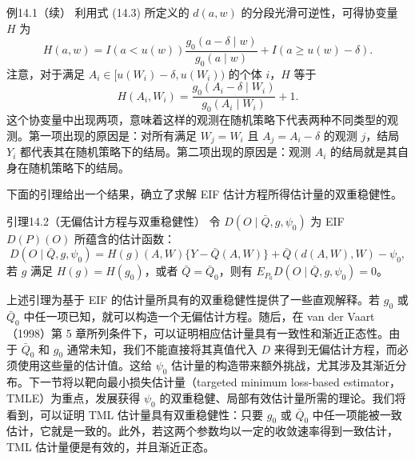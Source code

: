 \begin{bookresult}{例}{14.1（续）}
利用式 (14.3) 所定义的 $d(a,w)$ 的分段光滑可逆性，可得协变量 $H$ 为
\[
 H(a,w)=I(a<u(w))\frac{g_0(a-\delta\mid w)}{g_0(a\mid w)}
 +I(a\geq u(w)-\delta).
\]
注意，对于满足 $A_i\in[u(W_i)-\delta,u(W_i))$ 的个体 $i$，$H$ 等于
\[
 H(A_i,W_i)=\frac{g_0(A_i-\delta\mid W_i)}{g_0(A_i\mid W_i)}+1.
\]
这个协变量中出现两项，意味着这样的观测在随机策略下代表两种不同类型的观测。第一项出现的原因是：对所有满足 $W_j=W_i$ 且 $A_j=A_i-\delta$ 的观测 $j$，结局 $Y_i$ 都代表其在随机策略下的结局。第二项出现的原因是：观测 $A_i$ 的结局就是其自身在随机策略下的结局。
\end{bookresult}

下面的引理给出一个结果，确立了求解 EIF 估计方程所得估计量的双重稳健性。

\begin{bookresult}{引理}{14.2（无偏估计方程与双重稳健性）}
令 $D(O\mid\bar Q,g,\psi_0)$ 为 EIF $D(P)(O)$ 所蕴含的估计函数：
\[
 D(O\mid\bar Q,g,\psi_0)=H(g)(A,W)\{Y-\bar Q(A,W)\}
 +\bar Q(d(A,W),W)-\psi_0,
\]
若 $g$ 满足 $H(g)=H(g_0)$，或者 $\bar Q=\bar Q_0$，则有
$E_{P_0}D(O\mid\bar Q,g,\psi_0)=0$。
\end{bookresult}

上述引理为基于 EIF 的估计量所具有的双重稳健性提供了一些直观解释。若 $g_0$ 或 $\bar Q_0$ 中任一项已知，就可以构造一个无偏估计方程。随后，在 van der Vaart（1998）第 5 章所列条件下，可以证明相应估计量具有一致性和渐近正态性。由于 $\bar Q_0$ 和 $g_0$ 通常未知，我们不能直接将其真值代入 $D$ 来得到无偏估计方程，而必须使用这些量的估计值。这给 $\psi_0$ 估计量的构造带来额外挑战，尤其涉及其渐近分布。下一节将以靶向最小损失估计量（targeted minimum loss-based estimator，TMLE）为重点，发展获得 $\psi_0$ 的双重稳健、局部有效估计量所需的理论。我们将看到，可以证明 TML 估计量具有双重稳健性：只要 $g_0$ 或 $\bar Q_0$ 中任一项能被一致估计，它就是一致的。此外，若这两个参数均以一定的收敛速率得到一致估计，TML 估计量便是有效的，并且渐近正态。
